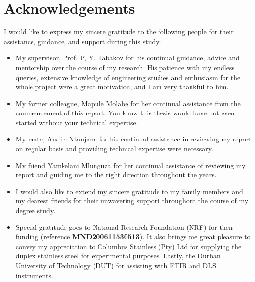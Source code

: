 \chapter{Acknowledgements}
I would like to express my sincere gratitude to the following people for their assistance, guidance, and support during this study:

\begin{itemize}
    \item My supervisor, Prof. P, Y. Tabakov for his continual guidance, advice and mentorship over the course of my research. His patience with my endless queries, extensive knowledge of engineering studies and enthusiasm for the whole project were a great motivation, and I am very thankful to him.

    \item My former colleague, Mapule Molabe for her continual assistance from the commencement of this report. You know this thesis would have not even started without your technical expertise.    

    \item My mate, Andile Ntanjana for his continual assistance in reviewing my report on regular basis and providing technical expertise were necessary.

    \item My friend Yamkelani Mlunguza for her continual assistance of reviewing my report and guiding me to the right direction throughout the years.

    \item I would also like to extend my sincere gratitude to my family members and my dearest friends for their unwavering support throughout the course of my degree study.

    \item Special gratitude goes to National Research Foundation (NRF) for their funding (reference \textbf{MND200611530513}). It also brings me great pleasure to convey my appreciation to Columbus Stainless (Pty) Ltd for supplying the duplex stainless steel for experimental purposes. Lastly, the Durban University of Technology (DUT) for assisting with FTIR and DLS instruments. 
 \end{itemize}